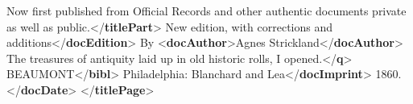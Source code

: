 \documentclass[11pt,twoside]{article}\makeatletter
\begin{document}
\begin{shaded}
Now first published from Official Records\mbox{}\newline 
\hspace*{1em}\hspace*{1em} and other authentic documents private as well as\mbox{}\newline 
\hspace*{1em}\hspace*{1em} public.{</\textbf{titlePart}>}\mbox{}\newline 
{}New edition, with corrections and\mbox{}\newline 
\hspace*{1em}\hspace*{1em} additions{</\textbf{docEdition}>}\mbox{}\newline 
{}By {<\textbf{docAuthor}>}Agnes Strickland{</\textbf{docAuthor}>}\mbox{}\newline 
{}\mbox{}\newline 
{}\mbox{}\newline 
\hspace*{1em}The treasures of antiquity laid up in old\mbox{}\newline 
\hspace*{1em}\hspace*{1em}\hspace*{1em}\hspace*{1em} historic rolls, I opened.{</\textbf{q}>}\mbox{}\newline 
\hspace*{1em}BEAUMONT{</\textbf{bibl}>}\mbox{}\newline 
{}\mbox{}\newline 
{}Philadelphia: Blanchard and Lea{</\textbf{docImprint}>}\mbox{}\newline 
{}1860.{</\textbf{docDate}>}\mbox{}\newline 
{</\textbf{titlePage}>}\end{shaded}\egroup\par 
\end{document}
